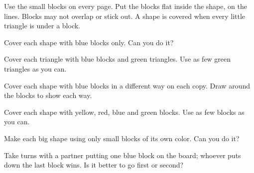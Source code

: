 \documentclass[12pt]{article}
\newcommand{\probline}[3][5.45in]{%
  \noindent\begin{minipage}[t]{#1}\vspace{0pt}\raggedright\Large #2\end{minipage}\hfill
  \begin{minipage}[t]{\dimexpr 7.4in-#1\relax}\vspace{4pt}\raggedleft\end{minipage}\par}
\begin{document}
\Large

Use the small blocks on every page. Put the blocks flat inside the shape, on the lines. Blocks may not overlap or stick out. A shape is covered when every little triangle is under a block.

\vspace{0.3in}
\probline{ Cover each shape with blue blocks only. Can you do it?}{k1-icons-B}
\vspace{0.2in}

\newpage
\probline{ Cover each triangle with blue blocks and green triangles. Use as few green triangles as you can.}{k1-icons-BG}
\vspace{0.2in}

\newpage
\probline{ Cover each shape with blue blocks in a different way on each copy. Draw around the blocks to show each way.}{k1-icons-B}
\vspace{0.25in}

\newpage
{}

\newpage
\probline[4.45in]{ Cover each shape with yellow, red, blue and green blocks. Use as few blocks as you can.}{k1-icons-YRBG}
\vspace{0.2in}

\newpage
\noindent\begin{minipage}[t]{5.45in}\raggedright\Large {} Make each big shape using only small blocks of its own color. Can you do it?\end{minipage}\par
\vspace{0.2in}

\newpage
{}

\newpage
\probline{ Take turns with a partner putting one blue block on the board; whoever puts down the last block wins. Is it better to go first or second?}{k1-icons-B}
\vspace{0.25in}
\end{document}
